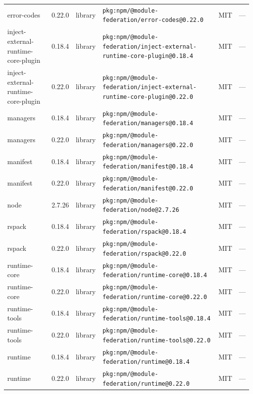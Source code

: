 \documentclass[11pt,a4paper]{article}
\begin{document}
\begin{longtable}{|p{4cm}|p{2cm}|p{1.6cm}|p{5cm}|p{1.5cm}|p{3.5cm}|}
\raggedright error-codes & 0.22.0 & library & \small\texttt{pkg:npm/@module-federation/error-codes@0.22.0} & MIT & \small — \\
\raggedright inject-external-runtime-core-plugin & 0.18.4 & library & \small\texttt{pkg:npm/@module-federation/inject-external-runtime-core-plugin@0.18.4} & MIT & \small — \\
\raggedright inject-external-runtime-core-plugin & 0.22.0 & library & \small\texttt{pkg:npm/@module-federation/inject-external-runtime-core-plugin@0.22.0} & MIT & \small — \\
\raggedright managers & 0.18.4 & library & \small\texttt{pkg:npm/@module-federation/managers@0.18.4} & MIT & \small — \\
\raggedright managers & 0.22.0 & library & \small\texttt{pkg:npm/@module-federation/managers@0.22.0} & MIT & \small — \\
\raggedright manifest & 0.18.4 & library & \small\texttt{pkg:npm/@module-federation/manifest@0.18.4} & MIT & \small — \\
\raggedright manifest & 0.22.0 & library & \small\texttt{pkg:npm/@module-federation/manifest@0.22.0} & MIT & \small — \\
\raggedright node & 2.7.26 & library & \small\texttt{pkg:npm/@module-federation/node@2.7.26} & MIT & \small — \\
\raggedright rspack & 0.18.4 & library & \small\texttt{pkg:npm/@module-federation/rspack@0.18.4} & MIT & \small — \\
\raggedright rspack & 0.22.0 & library & \small\texttt{pkg:npm/@module-federation/rspack@0.22.0} & MIT & \small — \\
\raggedright runtime-core & 0.18.4 & library & \small\texttt{pkg:npm/@module-federation/runtime-core@0.18.4} & MIT & \small — \\
\raggedright runtime-core & 0.22.0 & library & \small\texttt{pkg:npm/@module-federation/runtime-core@0.22.0} & MIT & \small — \\
\raggedright runtime-tools & 0.18.4 & library & \small\texttt{pkg:npm/@module-federation/runtime-tools@0.18.4} & MIT & \small — \\
\raggedright runtime-tools & 0.22.0 & library & \small\texttt{pkg:npm/@module-federation/runtime-tools@0.22.0} & MIT & \small — \\
\raggedright runtime & 0.18.4 & library & \small\texttt{pkg:npm/@module-federation/runtime@0.18.4} & MIT & \small — \\
\raggedright runtime & 0.22.0 & library & \small\texttt{pkg:npm/@module-federation/runtime@0.22.0} & MIT & \small — \\

\end{longtable}
\end{document}
